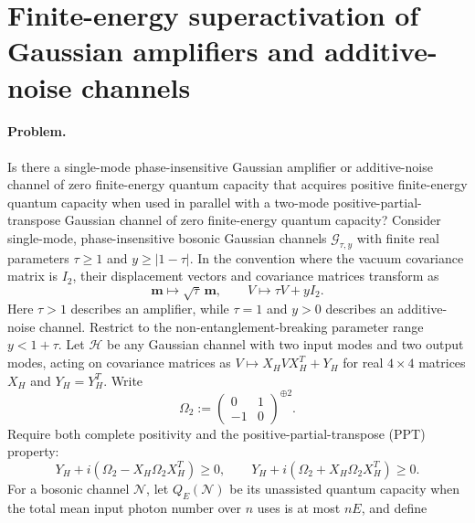 \section{Finite-energy superactivation of Gaussian amplifiers and additive-noise channels}
\label{sec:op_7388956ad5c7eb27}

\paragraph{Problem.}
Is there a single-mode phase-insensitive Gaussian amplifier or additive-noise channel of zero finite-energy quantum capacity that acquires positive finite-energy quantum capacity when used in parallel with a two-mode positive-partial-transpose Gaussian channel of zero finite-energy quantum capacity?
Consider single-mode, phase-insensitive bosonic Gaussian channels $\mathcal G_{\tau,y}$ with finite real parameters $\tau\geq1$ and $y\geq|1-\tau|$. In the convention where the vacuum covariance matrix is $I_2$, their displacement vectors and covariance matrices transform as
\begin{equation}
 \boldsymbol m\longmapsto\sqrt\tau\,\boldsymbol m,
 \qquad
 V\longmapsto\tau V+yI_2.
 \label{eq:7388-single-mode}
\end{equation}
Here $\tau>1$ describes an amplifier, while $\tau=1$ and $y>0$ describes an additive-noise channel. Restrict to the non-entanglement-breaking parameter range $y<1+\tau$.
Let $\mathcal H$ be any Gaussian channel with two input modes and two output modes, acting on covariance matrices as $V\mapsto X_HVX_H^T+Y_H$ for real $4\times4$ matrices $X_H$ and $Y_H=Y_H^T$. Write
\begin{equation}
 \Omega_2:=\begin{pmatrix}0&1\\-1&0\end{pmatrix}^{\oplus2}.
 \label{eq:7388-symplectic-form}
\end{equation}
Require both complete positivity and the positive-partial-transpose (PPT) property:
\begin{equation}
 Y_H+i(\Omega_2-X_H\Omega_2X_H^T)\geq0,
 \qquad
 Y_H+i(\Omega_2+X_H\Omega_2X_H^T)\geq0.
 \label{eq:7388-cp-ppt}
\end{equation}
For a bosonic channel $\mathcal N$, let $Q_E(\mathcal N)$ be its unassisted quantum capacity when the total mean input photon number over $n$ uses is at most $nE$, and define
